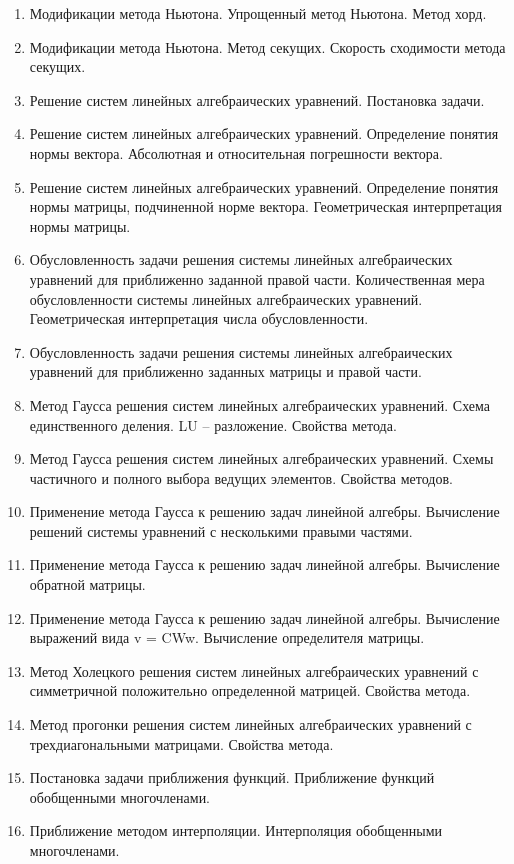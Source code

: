 \documentclass[14pt]{extarticle}
\begin{document}
\begin{enumerate}
    \item Модификации метода Ньютона. Упрощенный метод Ньютона. Метод хорд. 
    \item Модификации метода Ньютона. Метод секущих. Скорость сходимости метода секущих. 
    \item Решение систем линейных алгебраических уравнений. Постановка задачи. 
    \item Решение систем линейных алгебраических уравнений. Определение понятия нормы вектора. Абсолютная и относительная погрешности вектора. 
    \item Решение систем линейных алгебраических уравнений. Определение понятия нормы матрицы, подчиненной норме вектора. Геометрическая интерпретация нормы матрицы. 
    \item Обусловленность задачи решения системы линейных алгебраических уравнений для приближенно заданной правой части. Количественная мера обусловленности системы линейных алгебраических уравнений. Геометрическая интерпретация числа обусловленности. 
    \item Обусловленность задачи решения системы линейных алгебраических уравнений для приближенно заданных матрицы и правой части. 
    \item Метод Гаусса решения систем линейных алгебраических уравнений. Схема единственного деления. LU – разложение. Свойства метода. 
    \item Метод Гаусса решения систем линейных алгебраических уравнений. Схемы частичного и полного выбора ведущих элементов. Свойства методов. 
    \item Применение метода Гаусса к решению задач линейной алгебры. Вычисление решений системы уравнений с несколькими правыми частями. 
    \item Применение метода Гаусса к решению задач линейной алгебры. Вычисление обратной матрицы. 
    \item Применение метода Гаусса к решению задач линейной алгебры. Вычисление выражений вида v = CWw. Вычисление определителя матрицы. 
    \item Метод Холецкого решения систем линейных алгебраических уравнений с симметричной положительно определенной матрицей. Свойства метода. 
    \item Метод прогонки решения систем линейных алгебраических уравнений с трехдиагональными матрицами. Свойства метода. 
    \item Постановка задачи приближения функций. Приближение функций обобщенными многочленами. 
    \item Приближение методом интерполяции. Интерполяция обобщенными многочленами. 

\end{enumerate}
\end{document}
